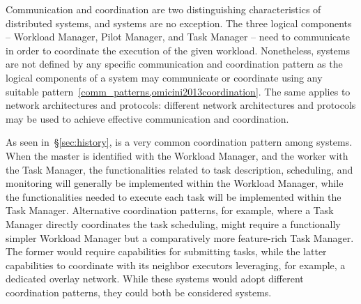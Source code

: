 \documentclass{sig-alternate}
\begin{document}

Communication and coordination are two distinguishing characteristics of
distributed systems, and \pilotjob systems are no exception. The three logical
components -- Workload Manager, Pilot Manager, and Task Manager -- need to
communicate in order to coordinate the execution of the given workload.
Nonetheless, \pilotjob systems are not defined by any specific communication and
coordination pattern as the logical components of a \pilotjob system may
communicate or coordinate using any suitable
pattern~\ref{comm_patterns,omicini2013coordination}. The same applies to network
architectures and protocols: different network architectures and protocols may
be used to achieve effective communication and coordination.


As seen in~\S\ref{sec:history}, \MW is a very common coordination pattern among
\pilotjob systems. When the master is identified with the Workload Manager, and
the worker with the Task Manager, the functionalities related to task
description, scheduling, and monitoring will generally be implemented within the
Workload Manager, while the functionalities needed to execute each task will be
implemented within the Task Manager. Alternative coordination patterns, for
example, where a Task Manager directly coordinates the task scheduling, might
require a functionally simpler Workload Manager but a comparatively more
feature-rich Task Manager. The former would require capabilities for submitting
tasks, while the latter capabilities to coordinate with its neighbor executors
leveraging, for example, a dedicated overlay network. While these systems would
adopt different coordination patterns, they could both be considered \pilotjob
systems.

\end{document}
